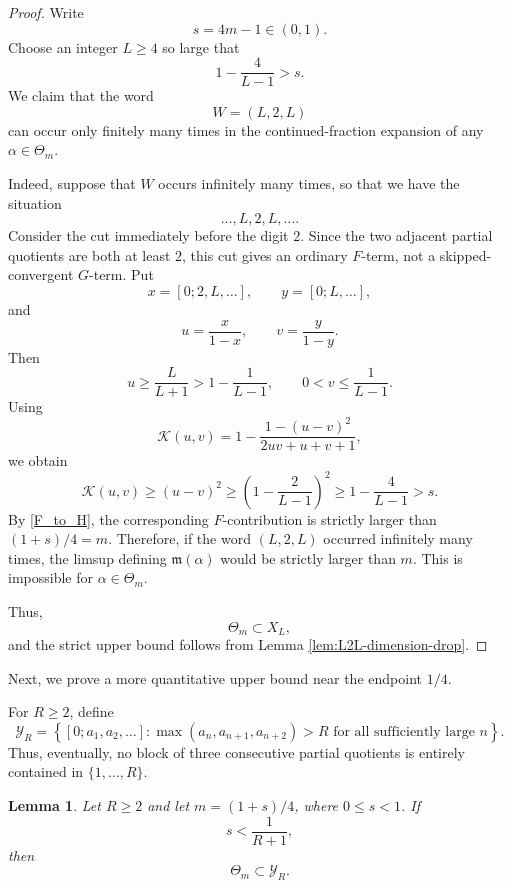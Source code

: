 \documentclass[11pt]{amsart}
\newtheorem{lemma}[theorem]{Lemma}
\newcommand{\Kfun}{\mathcal K}
\begin{document}
\begin{proof}
Write
$$
s=4m-1\in(0,1).
$$
Choose an integer $L\ge4$ so large that
\begin{equation}\label{eq:L-for-upper-bound}
1-\frac{4}{L-1}>s.
\end{equation}
We claim that the word
$$
W=(L,2,L)
$$
can occur only finitely many times in the continued-fraction expansion of any
$\alpha\in\Theta_m$.

Indeed, suppose that $W$ occurs infinitely many times, so that we have the situation
$$
\ldots,L,2,L,\ldots .
$$
Consider the cut immediately before the digit $2$.  Since the two adjacent partial quotients are both at least $2$, this cut gives an ordinary $F$-term, not a skipped-convergent $G$-term.  Put
$$
x=[0;2,L,\ldots],
\qquad
y=[0;L,\ldots],
$$
and
$$
u=\frac{x}{1-x},
\qquad
v=\frac{y}{1-y}.
$$
Then
$$
u\ge \frac{L}{L+1}>1-\frac{1}{L-1},
\qquad
0<v\le \frac{1}{L-1}.
$$
Using
$$
\Kfun(u,v)
=
1-\frac{1-(u-v)^2}{2uv+u+v+1},
$$
we obtain
$$
\Kfun(u,v)
\ge (u-v)^2
\ge
\left(1-\frac{2}{L-1}\right)^2
\ge
1-\frac{4}{L-1}
>s.
$$
By \eqref{F_to_H}, the corresponding $F$-contribution is strictly larger than $(1+s)/4=m$.  Therefore, if the word $(L,2,L)$ occurred infinitely many times, the limsup defining $\mathfrak m(\alpha)$ would be strictly larger than $m$. This is impossible for $\alpha\in\Theta_m$.

Thus,
$$
\Theta_m\subset X_L,
$$
and the strict upper bound follows from Lemma \ref{lem:L2L-dimension-drop}.
\end{proof}

Next, we prove a more quantitative upper bound near the endpoint $1/4$.

For $R\ge2$, define
$$
\mathcal Y_R
=
\left\{
[0;a_1,a_2,\ldots]:
\max(a_n,a_{n+1},a_{n+2})>R
\text{ for all sufficiently large } n
\right\}.
$$
Thus, eventually, no block of three consecutive partial quotients is entirely
contained in $\{1,\ldots,R\}$.

\begin{lemma}\label{lem:small-triples-forbidden}
Let $R\ge2$ and let $m=(1+s)/4$, where $0\le s<1$.  If
\begin{equation}\label{eq:s-small-relative-R}
s<\frac{1}{R+1},
\end{equation}
then
$$
\Theta_m\subset \mathcal Y_R.
$$
\end{lemma}
\end{document}
